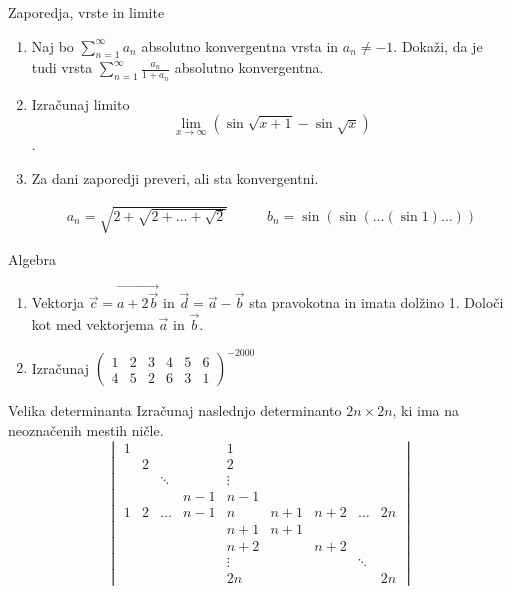 \begin{frame}{Zaporedja, vrste in limite}
	\begin{enumerate}
		\item 
		Naj bo $\sum_{n=1}^\infty a_n$ absolutno konvergentna vrsta in $a_n \ne -1$.
		Dokaži, da je tudi vrsta $\sum_{n=1}^\infty \frac{a_n}{1+a_n}$
		absolutno konvergentna.

		\item
		Izračunaj limito
		$$\displaystyle \lim_{x \to \infty} (\sin \sqrt{x+1} - \sin \sqrt{x})$$.

		\item
		Za dani zaporedji preveri, ali sta konvergentni.
		 
		 \begin{align*}
			a_n = \sqrt{2+\sqrt{2+\dots+\sqrt{2}}} \qquad &
			 b_n = \sin(\sin(\dots(\sin 1)\dots))
		 \end{align*}
		
	\end{enumerate}
\end{frame}

\begin{frame}{Algebra}
	\begin{enumerate}
		\item
		Vektorja $\vec{c} = \vec{a + 2\vec{b}}$ in $\vec{d} = \vec{a} - \vec{b}$
		sta pravokotna in imata dolžino 1. Določi kot med vektorjema $\vec{a}$ in $\vec{b}$.
		\item 
		Izračunaj
		$
		\begin{pmatrix}
			1 & 2 & 3 & 4 & 5 & 6 \\
			4 & 5 & 2 & 6 & 3 & 1
		\end{pmatrix}^{-2000}
		$
	\end{enumerate}
\end{frame}

\begin{frame}{Velika determinanta}
	Izračunaj naslednjo determinanto $2n \times 2n$, ki ima na neoznačenih mestih ničle.
	$$
	\begin{vmatrix}
		1&&&&1&&&& \\
		&2&&&2&&&& \\
		&&\ddots&&\vdots&&&& \\
		&&&n-1&n-1&&&& \\ 
		1&2&\dots&n-1&n&n+1&n+2&\dots&2n \\
		&&&&n+1&n+1&&& \\
		&&&&n+2&&n+2&& \\
		&&&&\vdots&&&\ddots& \\
		&&&&2n&&&&2n
	\end{vmatrix}
	$$
\end{frame}

